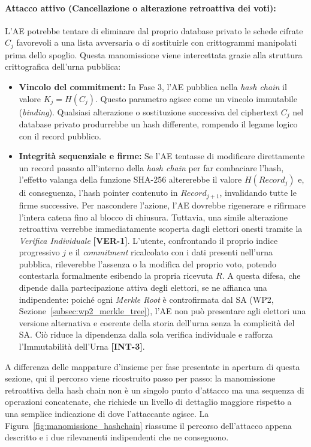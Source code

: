 \paragraph{Attacco attivo (Cancellazione o alterazione retroattiva dei voti):} L'AE potrebbe tentare di eliminare dal proprio database privato le schede cifrate $C_j$ favorevoli a una lista avversaria o di sostituirle con crittogrammi manipolati prima dello spoglio. Questa manomissione viene intercettata grazie alla struttura crittografica dell'urna pubblica:
\begin{itemize}
    \item \textbf{Vincolo del commitment:} In Fase 3, l'AE pubblica nella \textit{hash chain} il valore $K_j=H(C_j)$. Questo parametro agisce come un vincolo immutabile (\textit{binding}). Qualsiasi alterazione o sostituzione successiva del ciphertext $C_j$ nel database privato produrrebbe un hash differente, rompendo il legame logico con il record pubblico.
    \item \textbf{Integrità sequenziale e firme:} Se l'AE tentasse di modificare direttamente un record passato all'interno della \textit{hash chain} per far combaciare l'hash, l'effetto valanga della funzione SHA-256 altererebbe il valore $H(Record_j)$ e, di conseguenza, l'hash pointer contenuto in $Record_{j+1}$, invalidando tutte le firme successive. Per nascondere l'azione, l'AE dovrebbe rigenerare e rifirmare l'intera catena fino al blocco di chiusura. Tuttavia, una simile alterazione retroattiva verrebbe immediatamente scoperta dagli elettori onesti tramite la \textit{Verifica Individuale} \textbf{[VER-1]}. L'utente, confrontando il proprio indice progressivo $j$ e il \textit{commitment} ricalcolato con i dati presenti nell'urna pubblica, rileverebbe l'assenza o la modifica del proprio voto, potendo contestarla formalmente esibendo la propria ricevuta $R$. A questa difesa, che dipende dalla partecipazione attiva degli elettori, se ne affianca una indipendente: poiché ogni \textit{Merkle Root} è controfirmata dal SA (WP2, Sezione~\ref{subsec:wp2_merkle_tree}), l'AE non può presentare agli elettori una versione alternativa e coerente della storia dell'urna senza la complicità del SA. Ciò riduce la dipendenza dalla sola verifica individuale e rafforza l'Immutabilità dell'Urna \textbf{[INT-3]}.
\end{itemize}

A differenza delle mappature d'insieme per fase presentate in apertura di questa sezione, qui il percorso viene ricostruito passo per passo: la manomissione retroattiva della hash chain non è un singolo punto d'attacco ma una sequenza di operazioni concatenate, che richiede un livello di dettaglio maggiore rispetto a una semplice indicazione di dove l'attaccante agisce. La Figura~\ref{fig:manomissione_hashchain} riassume il percorso dell'attacco appena descritto e i due rilevamenti indipendenti che ne conseguono.

